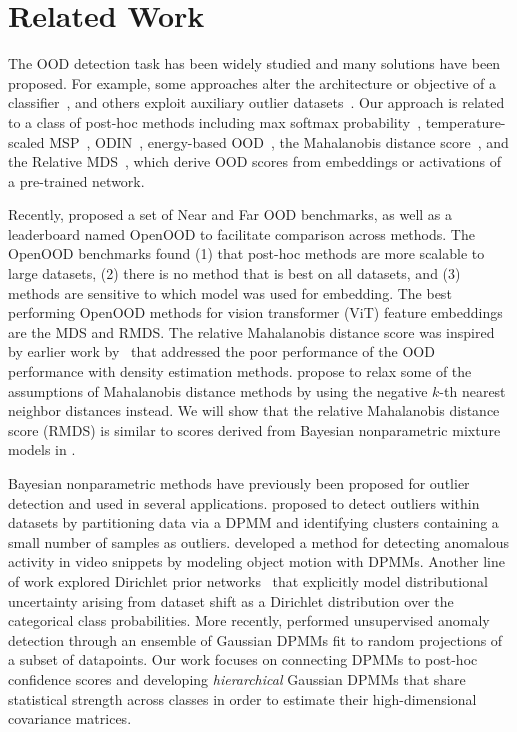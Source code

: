 \section{Related Work}
\label{sec:relatedwork}
The OOD detection task has been widely studied and many solutions have been proposed.
For example, some approaches alter the architecture or objective of a classifier~\citep{TackJ20,HuangR21,wei2022mitigating,linderman23}, and others exploit auxiliary outlier datasets~\citep{HendrycksD19,zhang2021mixture}.
Our approach is related to a class of post-hoc methods including max softmax probability~\citep[MSP;][]{HendrycksD17}, temperature-scaled MSP~\citep{guo17tempscale}, ODIN~\citep{LiangS18}, energy-based OOD~\cite{LiuW20}, the Mahalanobis distance score~\citep[MDS;][]{lee18mds}, and the Relative MDS~\citep{ren21rmds}, which derive OOD scores from embeddings or activations of a pre-trained network.

Recently, \citet{zhang23openood15} proposed a set of Near and Far OOD benchmarks, as well as a leaderboard named OpenOOD to facilitate comparison across methods. The OpenOOD benchmarks found (1) that post-hoc methods are more scalable to large datasets, (2) there is no method that is best on all datasets, and (3) methods are sensitive to which model was used for embedding.
The best performing OpenOOD methods for vision transformer (ViT) feature embeddings are the MDS and RMDS.
The relative Mahalanobis distance score was inspired by earlier work by~\citet{ren2019likelihood} that addressed the poor performance of the OOD performance with density estimation methods.
\citet{sun2022out} propose to relax some of the assumptions of Mahalanobis distance methods by using the negative $k$-th nearest neighbor distances instead.
We will show that the relative Mahalanobis distance score (RMDS) is similar to scores derived from Bayesian nonparametric mixture models in .

Bayesian nonparametric methods have previously been proposed for outlier detection and used in several applications. \citet{shotwell2011} proposed to detect outliers within datasets by partitioning data via a DPMM and identifying clusters containing a small number of samples as outliers.
\citet{varadarajan17} developed a method for detecting anomalous activity in video snippets by modeling object motion with DPMMs. Another line of work explored Dirichlet prior networks~\citep[DPN;][]{malinin2018predictive,malinin2019reverse} that explicitly model distributional uncertainty arising from dataset shift as a Dirichlet distribution over the categorical class probabilities.
More recently, \citet{Kim2024UnsupervisedOD} performed unsupervised anomaly detection through an ensemble of Gaussian DPMMs fit to random projections of a subset of datapoints.
Our work focuses on connecting DPMMs to post-hoc confidence scores and developing \textit{hierarchical} Gaussian DPMMs that share statistical strength across classes in order to estimate their high-dimensional covariance matrices.
